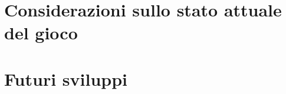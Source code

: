\section{Considerazioni sullo stato attuale del gioco}

\section{Futuri sviluppi} \label{sec:futuredevelop}